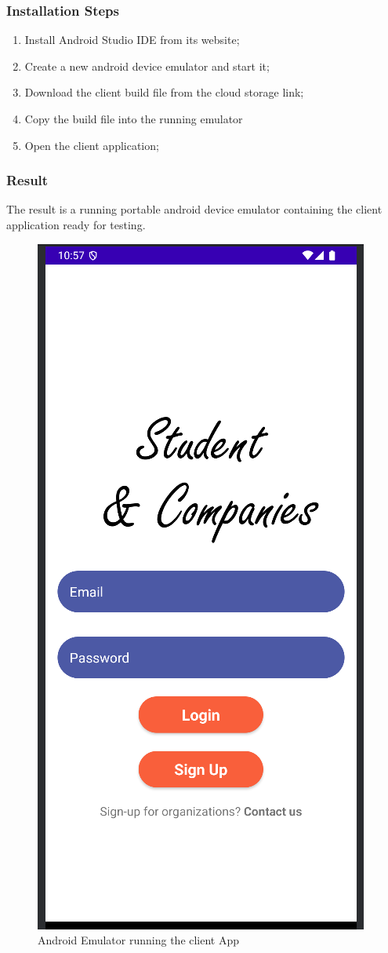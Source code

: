 \subsubsection*{Installation Steps}
\begin{enumerate}
    \item Install Android Studio IDE from its website;
    \item Create a new android device emulator and start it;
    \item Download the client build file from the cloud storage link;
    \item Copy the build file into the running emulator
    \item Open the client application;
\end{enumerate}

\subsubsection*{Result}
The result is a running portable android device emulator containing the client application ready for testing.


\begin{figure}[H]
    \centering
    \includegraphics[width=0.3\linewidth]{Latex/Images/ATD/AndroidApp.png}
    \caption{Android Emulator running the client App}
    \label{fig:androidapp}
\end{figure}




